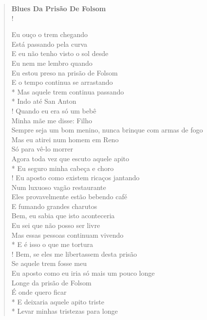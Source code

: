 \documentclass[11pt]{extarticle}
\begin{document}

\begin{verse}
\textbf{Blues Da Prisão De Folsom}\\!

Eu ouço o trem chegando\\
Está passando pela curva\\
E eu não tenho visto o sol desde\\
Eu nem me lembro quando\\
Eu estou preso na prisão de Folsom\\
E o tempo continua se arrastando\\*
Mas aquele trem continua passando\\*
Indo até San Anton\\!
Quando eu era só um bebê\\
Minha mãe me disse: Filho\\
Sempre seja um bom menino, nunca brinque com armas de fogo\\
Mas eu atirei num homem em Reno\\
Só para vê-lo morrer\\
Agora toda vez que escuto aquele apito\\*
Eu seguro minha cabeça e choro\\!
Eu aposto como existem ricaços jantando\\
Num luxuoso vagão restaurante\\
Eles provavelmente estão bebendo café\\
E fumando grandes charutos\\
Bem, eu sabia que isto aconteceria\\
Eu sei que não posso ser livre\\
Mas essas pessoas continuam vivendo\\*
E é isso o que me tortura\\!
Bem, se eles me libertassem desta prisão\\
Se aquele trem fosse meu\\
Eu aposto como eu iria só mais um pouco longe\\
Longe da prisão de Folsom\\
É onde quero ficar\\*
E deixaria aquele apito triste\\*
Levar minhas tristezas para longe
\end{verse}
\end{document}
